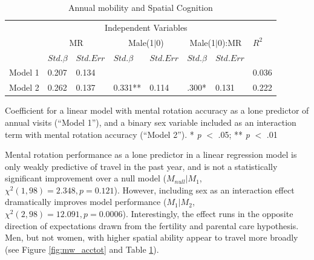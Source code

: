 \begin{table}[!tb]
\caption {Annual mobility and Spatial Cognition}
\label{tab:wm_spacemob}
  \centering
  \begin{tabular}{| l  ll  ll  ll  l |} 
    \hline   
  & \multicolumn{6}{c}{Independent Variables}& \\    
  & \multicolumn{2}{c}{MR} & \multicolumn{2}{c}{Male(1$|$0)} & \multicolumn{2}{c}{Male(1$|$0):MR} & $R^2$ \\
  & $Std. \beta$ & $Std. Err$ & $Std. \beta$ & $Std. Err$ & $Std. \beta$ & $Std. Err$  & \\
  Model 1 & 0.207\phantom{**} & 0.134\phantom{**} & & & & & 0.036\phantom{**} \\
  Model 2 & 0.262 & 0.137\phantom{**} & 0.331** & 0.114\phantom{**} & .300* & 0.131\phantom{**} & 0.222\\
  \hline 
  \end{tabular}  
{Coefficient for a linear model with mental rotation accuracy as a lone predictor of annual visits (``Model 1''), and a binary sex variable included as an interaction term with mental rotation accuracy (``Model 2'').  * \emph{p} $<$ .05; ** \emph{p} $<$  .01 }
\end{table}

Mental rotation performance as a lone predictor in a linear regression model is only weakly predictive of travel in the past year, and is not a statistically significant improvement over a null model ($M_{null} | M_1$, $\chi^2(1, 98) = 2.348, p = 0.121$).  However, including sex as an interaction effect dramatically improves model performance ($M_1 | M_2$, $\chi^2(2, 98) = 12.091, p = 0.0006$).  Interestingly, the effect runs in the opposite direction of expectations drawn from the fertility and parental care hypothesis.  Men, but not women, with higher spatial ability appear to travel more broadly (see Figure \ref{fig:mw_acctot} and Table \ref{tab:wm_spacemob}).

